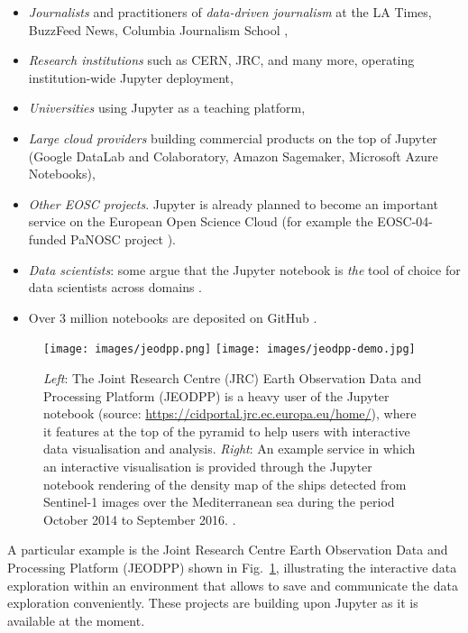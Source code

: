 \begin{itemize}
\item \emph{Journalists} and practitioners of \emph{data-driven
    journalism} at the LA Times, BuzzFeed News, Columbia Journalism School \cite{latimes-datadesk} \cite{columbia-nytimes} \cite{data-journalism},
\item \emph{Research institutions} such as CERN, JRC, and many more,
  operating institution-wide Jupyter deployment,
\item \emph{Universities} using Jupyter as a teaching platform,
\item \emph{Large cloud providers} building commercial products on the
  top of Jupyter (Google DataLab and Colaboratory, Amazon Sagemaker, Microsoft Azure
  Notebooks),
\item \emph{Other EOSC projects}. Jupyter is already planned to become
  an important service on the European Open Science Cloud (for example
  the EOSC-04-funded PaNOSC project \cite{panosc}).
\item \emph{Data scientists}: some argue that the Jupyter notebook is
  \emph{the} tool of choice for data scientists across domains
  \cite{Perkel2018}.
\item Over 3 million notebooks are deposited on GitHub \cite{notebookcount}.
\end{itemize}
%
\begin{figure}[tb]
  \centering\texttt{[image: images/jeodpp.png]}
  \centering\texttt{[image: images/jeodpp-demo.jpg]}
  \caption{\emph{Left}: The Joint Research Centre (JRC) Earth Observation
    Data and Processing Platform (JEODPP) is a heavy user of the
    Jupyter notebook (source:
    \url{https://cidportal.jrc.ec.europa.eu/home/}), where it features
    at the top of the pyramid to help users with interactive data
    visualisation and analysis. \emph{Right}: An example
    service in which an interactive visualisation is provided through
    the Jupyter notebook rendering of the density map of the ships
    detected from Sentinel-1 images over the Mediterranean sea during
    the period October 2014 to September 2016. \cite[Figure
    6]{Soille2018}. \label{fig:jeodpp}}
\end{figure}
%
A particular example is the Joint Research Centre Earth Observation
Data and Processing Platform (JEODPP) shown in Fig.~\ref{fig:jeodpp},
illustrating the interactive data exploration within an environment
that allows to save and communicate the data exploration
conveniently. These projects are building upon Jupyter as it is
available at the moment.
\bigskip

